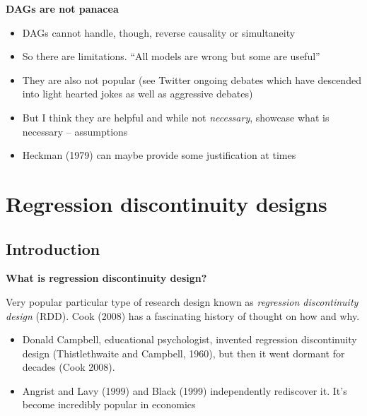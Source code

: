 \documentclass[notes=show]{beamer}
\begin{document}
\begin{frame}[plain]
\begin{center}
\textbf{DAGs are not panacea}
\end{center}

\begin{itemize}
\item DAGs cannot handle, though, reverse causality or simultaneity
\item So there are limitations.  ``All models are wrong but some are useful''
\item They are also not popular (see Twitter ongoing debates which have descended into light hearted jokes as well as aggressive debates)
\item But I think they are helpful and while not \emph{necessary}, showcase what is necessary -- assumptions
\item Heckman (1979) can maybe provide some justification at times
\end{itemize}

\end{frame}


\section{Regression discontinuity designs}

\subsection{Introduction}



\begin{frame}

	\begin{center}
	\textbf{What is regression discontinuity design?}
	\end{center}
	
Very popular particular type of research design known as \emph{regression discontinuity design} (RDD).  Cook (2008) has a fascinating history of thought on how and why. 
		\begin{itemize}
		\item  Donald Campbell, educational psychologist, invented regression discontinuity design (Thistlethwaite and Campbell, 1960), but then it went dormant for decades (Cook 2008).  
		\item Angrist and Lavy (1999) and Black (1999) independently rediscover it. It's become incredibly popular in economics
		\end{itemize}
\end{frame}
\end{document}
